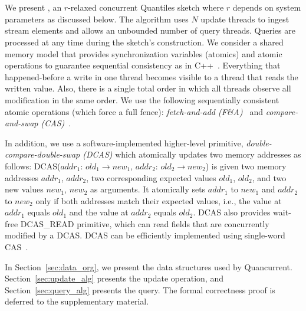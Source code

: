 \chapter{\mysketch}
\label{chap:quancurrent}

We present \mysketch, an $r$-relaxed concurrent Quantiles sketch where $r$ depends on system parameters as discussed below. The algorithm uses $N$ update threads to ingest stream elements and allows an unbounded number of query threads. Queries are processed at any time during the sketch's construction. 
We consider a shared memory model that provides synchronization variables (atomics) and atomic operations to guarantee sequential consistency as in C++~\cite{Boehm_2008_cpp}. Everything that happened-before a write in one thread becomes visible to a thread that reads the written value. Also, there is a single total order in which all threads observe all modification in the same order. 
We use the following sequentially consistent atomic operations (which force a full fence): \emph{fetch-and-add (F\&A)}~\cite{x86-faa} and \emph{compare-and-swap (CAS)}~\cite{x86-cas}. 

In addition, we use a software-implemented higher-level primitive, \emph{double-compare-double-swap (DCAS)} which atomically updates two memory addresses as follows: DCAS($addr_1$: $old_1 \to new_1$, $addr_2$: $old_2 \to new_2$)
is given two memory addresses $addr_1$, $addr_2$, two corresponding expected values $old_1$, $old_2$, and two new values $new_1$, $new_2$ as arguments. It atomically sets $addr_1$ to $new_1$ and $addr_2$ to $new_2$ only if both addresses match their expected values, i.e., the value at $addr_1$ equals $old_1$ and the value at $addr_2$ equals $old_2$. DCAS also provides wait-free DCAS\_READ primitive, which can read fields that are concurrently modified by a DCAS. DCAS can be efficiently implemented using single-word CAS~\cite{Harris2002practical,guerraoui2020efficient}. 


In Section~\ref{sec:data_org}, we present the data structures used by Quancurrent. Section~\ref{sec:update_alg} presents the update operation, and  Section~\ref{sec:query_alg} presents the query. The formal correctness proof is deferred to the supplementary material. 

